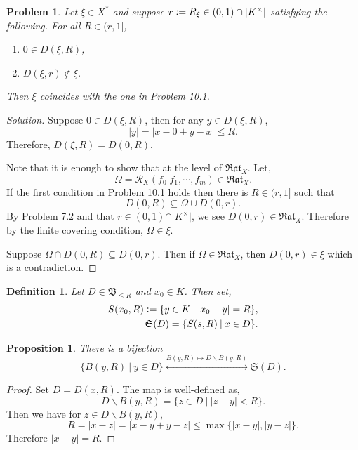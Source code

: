 \documentclass[8pt]{article}
\numberwithin{equation}{section}
\newenvironment{solution}{\begin{proof}[Solution]}{\end{proof}}
\newtheorem{proposition}{Proposition}[section]
\newtheorem{definition}{Definition}[section]
\newtheorem{problem}{Problem}[section]
\newcommand{\defeq}{\vcentcolon=}
\newcommand{\cR}[0]{\mathcal{R}}
\newcommand{\sep}[0]{\:|\:}
\newcommand{\ab}[1]{\vert #1 \vert}
\newcommand{\Rat}[0]{\mathfrak{Rat}}
\begin{document}
\begin{problem}
  Let $\xi\in X^*$ and suppose $r\defeq R_\xi\in(0,1)\cap\ab{K^\times}$ satisfying the following. For all $R\in(r,1]$,
  \begin{enumerate}
    \item $0\in D(\xi,R)$,\\
    \item $D(\xi,r)\not\in\xi$.
  \end{enumerate}
  Then $\xi$ coincides with the one in Problem 10.1.
\end{problem}
\begin{solution}
  Suppose $0\in D(\xi,R)$, then for any $y\in D(\xi,R)$, 
  \begin{equation*}
    \ab{y}=\ab{x-0+y-x}\leq R.
  \end{equation*}
  Therefore, $D(\xi,R) = D(0,R)$.
  \par Note that it is enough to show that at the level of $\Rat_X$. Let,
  \begin{equation*}
    \Omega = \cR_X(f_0|f_1,\cdots,f_m)\in\Rat_X.
  \end{equation*}
  If the first condition in Problem 10.1 holds then there is $R\in(r,1]$ such that 
  \begin{equation*}
    D(0,R)\subseteq\Omega\cup D(0,r).
  \end{equation*}
  By Problem 7.2 and that $r\in(0,1)\cap\ab{K^\times}$, we see $D(0,r)\in \Rat_X$. Therefore by the finite covering condition, $\Omega\in\xi$.
  \par Suppose $\Omega\cap D(0,R)\subseteq D(0,r)$. Then if $\Omega\in\Rat_X$, then $D(0,r)\in\xi$ which is a contradiction. 
\end{solution}
\begin{definition}
  Let $D\in\mathfrak{B}_{\leq R}$ and $x_0\in K$. Then set,
  \begin{align*}
    S(x_0,R) \defeq\{y\in K\sep \ab{x_0-y}=R\},\\
    \mathfrak{S}(D) = \{S(s,R)\sep x\in D\}.
  \end{align*}
\end{definition}
\begin{proposition}
  There is a bijection 
  \begin{equation*}
    \{B(y,R)\sep y\in D\}\stackrel{B(y,R)\mapsto D\backslash B(y,R)}{\longleftrightarrow} \mathfrak{S}(D).
  \end{equation*}
\end{proposition}
\begin{proof}
  Set $D= D(x,R)$. The map is well-defined as,
  \begin{equation*}
    D\backslash B(y,R) = \{z\in D\sep \ab{z-y}<R\}.
  \end{equation*}
Then we have for $z\in D\backslash B(y,R)$,
\begin{equation*}
  R = \ab{x-z} = \ab{x-y+y-z} \leq \max\{\ab{x-y},\ab{y-z}\}.
\end{equation*}
Therefore $\ab{x-y} = R$. 
\end{proof}
\end{document}
